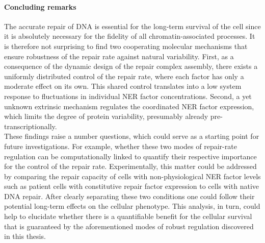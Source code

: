 %
%
%
%

\paragraph{Concluding remarks}
The accurate repair of DNA is essential for the long-term survival of the cell since it is absolutely necessary for the fidelity of all chromatin-associated processes. It is therefore not surprising to find two cooperating molecular mechanisms that ensure robustness of the repair rate against natural variability. First, as a consequence of the dynamic design of the repair complex assembly, there exists a uniformly distributed control of the repair rate, where each factor has only a moderate effect on its own. This shared control translates into a low system response to fluctuations in individual NER factor concentrations. Second, a yet unknown extrinsic mechanism regulates the coordinated NER factor expression, which limits the degree of protein variability, presumably already pre-transcriptionally.\\  
These findings raise a number questions, which could serve as a starting point for future investigations. For example, whether these two modes of repair-rate regulation can be computationally linked to quantify their respective importance for the control of the repair rate. Experimentally, this matter could be addressed by comparing the repair capacity of cells with non-physiological NER factor levels such as patient cells with constitutive repair factor expression to cells with native DNA repair. After clearly separating these two conditions one could follow their potential long-term effects on the cellular phenotype. This analysis, in turn, could help to elucidate whether there is a quantifiable benefit for the cellular survival that is guaranteed by the aforementioned modes of robust regulation discovered in this thesis.  

 




